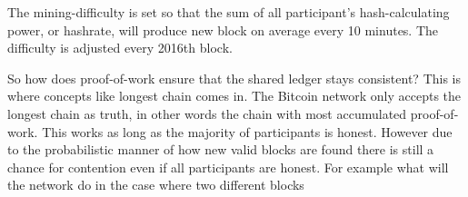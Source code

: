 The mining-difficulty is set so that the sum of all participant's hash-calculating power,
or hashrate, will produce  new block on average every 10 minutes. The difficulty is adjusted 
every 2016th block. 

So how does proof-of-work ensure that the shared ledger stays consistent? This is
where concepts like longest chain comes in. The Bitcoin network only accepts the longest
chain as truth, in other words the chain with most accumulated proof-of-work. 
This works as long as the majority of participants is honest. However due to the
probabilistic manner of how new valid blocks are found there is still a chance for 
contention even if all participants are honest. For example what will the network do
in the case where two different blocks 
